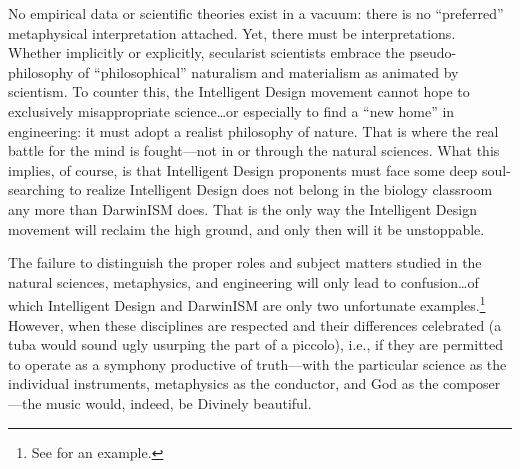 No empirical data or scientific theories exist in a vacuum: there is no ``preferred'' metaphysical interpretation attached. Yet, there must be interpretations. Whether implicitly or explicitly, secularist scientists embrace the pseudo-philosophy of ``philosophical'' naturalism and materialism as animated by scientism. To counter this, the Intelligent Design movement cannot hope to exclusively misappropriate science\ldots or especially to find a ``new home'' in engineering: it must adopt a realist philosophy of nature. That is where the real battle for the mind is fought---not in or through the natural sciences. What this implies, of course, is that Intelligent Design proponents must face some deep soul-searching to realize Intelligent Design does not belong in the biology classroom any more than DarwinISM does. That is the only way the Intelligent Design movement will reclaim the high ground, and only then will it be unstoppable.

The failure to distinguish the proper roles and subject matters studied in the natural sciences, metaphysics, and engineering will only lead to confusion\ldots of which Intelligent Design and DarwinISM are only two unfortunate examples.\footnote{See \citet[][p.~372]{sigcell} for an example.} However, when these disciplines are respected and their differences celebrated (a tuba would sound ugly usurping the part of a piccolo), i.e., if they are permitted to operate as a symphony productive of truth---with the particular science as the individual instruments, metaphysics as the conductor, and God as the composer---the music would, indeed, be Divinely beautiful.

